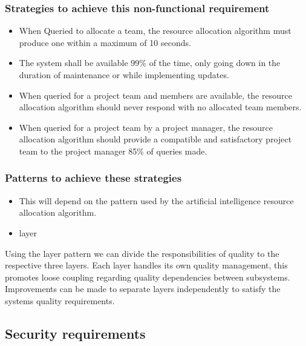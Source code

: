 \documentclass[]{article}
\begin{document}
    \subsubsection{Strategies to achieve this non-functional requirement}
    \begin{itemize}
        \item When Queried to allocate a team, the resource allocation algorithm must produce one within a maximum of 10 seconds.
        
        \item The system shall be available 99\% of the time, only going down in the duration of maintenance or while implementing updates.
        
        \item When queried for a project team and members are available, the resource allocation algorithm should never respond with no allocated team members. 
        
        \item When queried for a project team by a project manager, the resource allocation algorithm should provide a compatible and satisfactory project team to the project manager 85\% of queries made. 
    \end{itemize}
    
    \subsubsection{Patterns to achieve these strategies}
    \begin{itemize}
        \item This will depend on the pattern used by the artificial intelligence resource allocation algorithm. 
        \item layer
    \end{itemize}
    Using the layer pattern we can divide the responsibilities of quality to the respective three layers. Each layer handles its own quality management, this promotes loose coupling regarding quality dependencies between subsystems. Improvements can be made to separate layers independently to satisfy the systems quality requirements.
    
\subsection{Security requirements}
\end{document}
